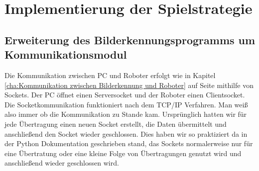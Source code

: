 
\chapter{Implementierung der Spielstrategie}
\section{Erweiterung des Bilderkennungsprogramms um Kommunikationsmodul}
Die Kommunikation zwischen PC und Roboter erfolgt wie in Kapitel \ref{cha:Kommunikation zwischen Bilderkennung und Roboter} auf Seite \pageref{cha:Kommunikation zwischen Bilderkennung und Roboter} mithilfe von Sockets. Der PC öffnet einen Serversocket und der Roboter einen Clientsocket. Die Socketkommunikation funktioniert nach dem TCP/IP Verfahren. Man weiß also immer ob die Kommunikation zu Stande kam.
Ursprünglich hatten wir für jede Übertragung einen neuen Socket erstellt, die Daten übermittelt und anschließend den Socket wieder geschlossen. Dies haben wir so praktiziert da in der Python Dokumentation geschrieben stand, das Sockets normalerweise nur für eine Übertratung oder eine kleine Folge von Übertragungen genutzt wird und anschließend wieder geschlossen wird.
